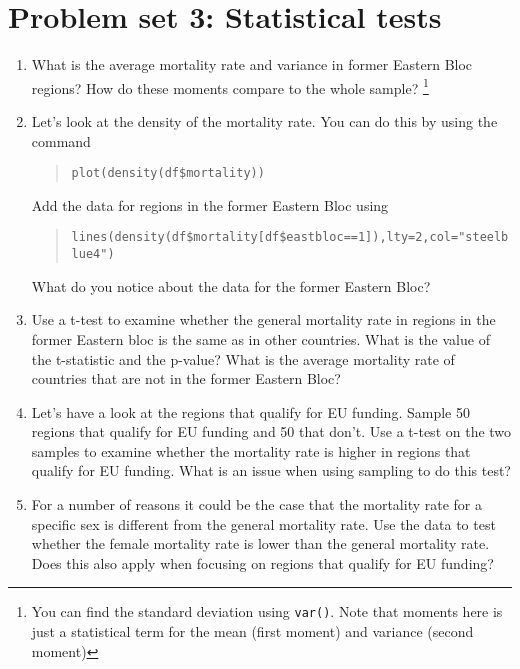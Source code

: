 \documentclass{tufte-handout}
\begin{document}
\clearpage

\section{Problem set 3: Statistical tests}

\begin{enumerate}
  \item What is the average mortality rate and variance in former Eastern Bloc regions?
  How do these moments compare to the whole sample? \footnote{You can find the standard deviation using \texttt{var()}. Note that moments here is just a statistical term for the mean (first moment) and variance (second moment)}
  
  \item Let's look at the density of the mortality rate. You can do this by using the command
  \begin{quote}
    \texttt{plot(density(df\$mortality))}
  \end{quote}
  
  Add the data for regions in the former Eastern Bloc using
  \begin{quote}
    \texttt{lines(density(df\$mortality[df\$eastbloc==1]),lty=2,col="steelblue4")}
  \end{quote}
  
  What do you notice about the data for the former Eastern Bloc?
  
  \item Use a t-test to examine whether the general mortality rate in regions in the former Eastern bloc is the same as in other countries. 
  What is the value of the t-statistic and the p-value? What is the average mortality rate of countries that are not in the former Eastern Bloc?
  
  \item Let's have a look at the regions that qualify for EU funding. 
  Sample 50 regions that qualify for EU funding and 50 that don't. 
  Use a t-test on the two samples to examine whether the mortality rate is higher in regions that qualify for EU funding. 
  What is an issue when using sampling to do this test?
  
  
  \item For a number of reasons it could be the case that the mortality rate for a specific sex is different from the general mortality rate. 
  Use the data to test whether the female mortality rate is lower than the general mortality rate. 
  Does this also apply when focusing on regions that qualify for EU funding?
  


\end{enumerate}
\end{document}
